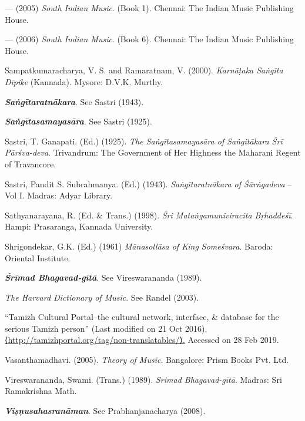 \begin{thebibliography}{99}
  — (2005) \textit{South Indian Music}. (Book 1). Chennai: The Indian Music Publishing House.

  — (2006) \textit{South Indian Music}. (Book 6). Chennai: The Indian Music Publishing House.

  Sampatkumaracharya, V. S. and Ramaratnam, V. (2000). \textit{Karnāṭaka Saṅgīta Dīpike} (Kannada). Mysore: D.V.K. Murthy.

  \textbf{\textit{Saṅgītaratnākara}}. See Sastri (1943).

  \textbf{\textit{Saṅgītasamayasāra}}. See Sastri (1925).

  Sastri, T. Ganapati. (Ed.) (1925). \textit{The Saṅgītasamayasāra of Saṅgitākara Śrī Pārśva-deva}. Trivandrum: The Government of Her Highness the Maharani Regent of Travancore. 

  Sastri, Pandit S. Subrahmanya. (Ed.) (1943). \textit{Saṅgītaratnākara of Śārṅgadeva} – Vol I. Madras: Adyar Library.

  Sathyanarayana, R. (Ed. \& Trans.) (1998). \textit{Śri Mataṅgamuniviracita Bṛhaddeśī}. Hampi: Prasaranga, Kannada University.

  Shrigondekar, G.K. (Ed.) (1961) \textit{Mānasollāsa of King Someśvara}. Baroda: Oriental Institute.

  \textbf{\textit{Śrīmad Bhagavad-gītā}}. See Vireswarananda (1989).

  \textit{The Harvard Dictionary of Music}. See Randel (2003).

  “Tamizh Cultural Portal–the cultural network, interface, \& database for the serious Tamizh person” (Last modified on 21 Oct 2016). \url{⟨http://tamizhportal.org/tag/non-translatables/⟩.} Accessed on 28 Feb 2019.

  Vasanthamadhavi. (2005). \textit{Theory of Music}. Bangalore: Prism Books Pvt. Ltd.

  Vireswarananda, Swami. (Trans.) (1989). \textit{Srimad Bhagavad-gītā}. Madras: Sri Ramakrishna Math.

  \textbf{\textit{Viṣṇusahasranāman}}. See Prabhanjanacharya (2008).

 \end{thebibliography}

